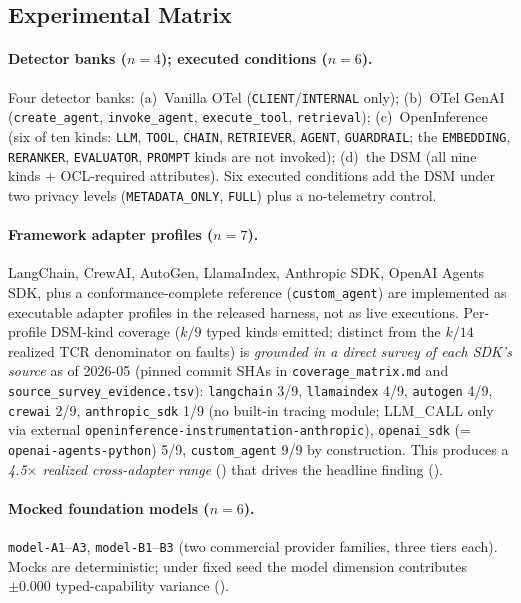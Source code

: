 \documentclass[a4paper,UKenglish,cleveref,autoref,thm-restate]{lipics-v2021}
\begin{document}
\subsection{Experimental Matrix}
\label{sec:matrix}

\paragraph*{Detector banks ($n=4$); executed conditions ($n=6$).}
Four detector banks: (a)~Vanilla OTel
(\texttt{CLIENT}/\texttt{INTERNAL} only); (b)~OTel GenAI
(\texttt{create\_agent}, \texttt{invoke\_agent},
\texttt{execute\_tool}, \texttt{retrieval}); (c)~OpenInference
(six of ten kinds: \texttt{LLM}, \texttt{TOOL}, \texttt{CHAIN},
\texttt{RETRIEVER}, \texttt{AGENT}, \texttt{GUARDRAIL}; the
\texttt{EMBEDDING}, \texttt{RERANKER}, \texttt{EVALUATOR},
\texttt{PROMPT} kinds are not invoked); (d)~the DSM (all nine
kinds + OCL-required attributes).  Six executed conditions add the
DSM under two privacy levels (\texttt{METADATA\_ONLY},
\texttt{FULL}) plus a no-telemetry control.

\paragraph*{Framework adapter profiles ($n=7$).}
LangChain, CrewAI, AutoGen, LlamaIndex, Anthropic SDK, OpenAI Agents
SDK, plus a conformance-complete reference (\texttt{custom\_agent})
are implemented as executable adapter profiles in the released
harness, not as live executions. Per-profile DSM-kind coverage
($k/9$ typed kinds emitted; distinct from the $k/14$ realized TCR
denominator on faults) is \emph{grounded in a direct survey of each
SDK's source} as of 2026-05 (pinned commit SHAs in
\texttt{coverage\_matrix.md} and \texttt{source\_survey\_evidence.tsv}):
\texttt{langchain} 3/9, \texttt{llamaindex} 4/9, \texttt{autogen}
4/9, \texttt{crewai} 2/9, \texttt{anthropic\_sdk} 1/9 (no built-in
tracing module; LLM\_CALL only via external
\texttt{openinference-instrumentation-anthropic}),
\texttt{openai\_sdk} (= \texttt{openai-agents-python}) 5/9,
\texttt{custom\_agent} 9/9 by construction. This produces a
\emph{4.5$\times$ realized cross-adapter range}
() that drives the headline finding
().

\paragraph*{Mocked foundation models ($n=6$).}
\texttt{model-A1}--\texttt{A3}, \texttt{model-B1}--\texttt{B3}
(two commercial provider families, three tiers each).
Mocks are deterministic; under fixed seed the model dimension
contributes $\pm 0.000$ typed-capability variance ().
\end{document}
